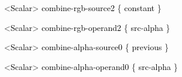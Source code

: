 \documentclass[a4paper]{article}
\newcommand\textstyleOOoComputerKeyWord[1]{\textrm{\textcolor[rgb]{0.0,0.0,0.5019608}{#1}}}
\newcommand\textstyleOOoAssemblerSpecialChar[1]{\textrm{\textcolor[rgb]{0.0,0.5019608,0.0}{#1}}}
\newcommand\textstyleOOoAssemblerIdent[1]{\textrm{\textcolor{black}{#1}}}
\begin{document}
{\color{black}
\textstyleOOoComputerKeyWord{\textcolor{black}{\ \ \ \ \ \ }}\textstyleOOoAssemblerSpecialChar{{\textless}}\textstyleOOoAssemblerIdent{Scalar}\textstyleOOoAssemblerSpecialChar{{\textgreater}}\textstyleOOoComputerKeyWord{\textcolor{black}{
}}\textstyleOOoAssemblerIdent{combine}\textstyleOOoAssemblerSpecialChar{{}-}\textstyleOOoAssemblerIdent{rgb}\textstyleOOoAssemblerSpecialChar{{}-}\textstyleOOoAssemblerIdent{source2}\textstyleOOoComputerKeyWord{\textcolor{black}{
}}\textstyleOOoAssemblerSpecialChar{\{}\textstyleOOoComputerKeyWord{\textcolor{black}{
}}\textstyleOOoAssemblerIdent{constant}\textstyleOOoComputerKeyWord{\textcolor{black}{
}}\textstyleOOoAssemblerSpecialChar{\}}}

{\color{black}
\textstyleOOoComputerKeyWord{\textcolor{black}{\ \ \ \ \ \ }}\textstyleOOoAssemblerSpecialChar{{\textless}}\textstyleOOoAssemblerIdent{Scalar}\textstyleOOoAssemblerSpecialChar{{\textgreater}}\textstyleOOoComputerKeyWord{\textcolor{black}{
}}\textstyleOOoAssemblerIdent{combine}\textstyleOOoAssemblerSpecialChar{{}-}\textstyleOOoAssemblerIdent{rgb}\textstyleOOoAssemblerSpecialChar{{}-}\textstyleOOoAssemblerIdent{operand2}\textstyleOOoComputerKeyWord{\textcolor{black}{
}}\textstyleOOoAssemblerSpecialChar{\{}\textstyleOOoComputerKeyWord{\textcolor{black}{
}}\textstyleOOoAssemblerIdent{src}\textstyleOOoAssemblerSpecialChar{{}-}\textstyleOOoAssemblerIdent{alpha}\textstyleOOoComputerKeyWord{\textcolor{black}{
}}\textstyleOOoAssemblerSpecialChar{\}}}

{\color{black}
\textstyleOOoComputerKeyWord{\textcolor{black}{\ \ \ \ \ \ }}\textstyleOOoAssemblerSpecialChar{{\textless}}\textstyleOOoAssemblerIdent{Scalar}\textstyleOOoAssemblerSpecialChar{{\textgreater}}\textstyleOOoComputerKeyWord{\textcolor{black}{
}}\textstyleOOoAssemblerIdent{combine}\textstyleOOoAssemblerSpecialChar{{}-}\textstyleOOoAssemblerIdent{alpha}\textstyleOOoAssemblerSpecialChar{{}-}\textstyleOOoAssemblerIdent{source0}\textstyleOOoComputerKeyWord{\textcolor{black}{
}}\textstyleOOoAssemblerSpecialChar{\{}\textstyleOOoComputerKeyWord{\textcolor{black}{
}}\textstyleOOoAssemblerIdent{previous}\textstyleOOoComputerKeyWord{\textcolor{black}{
}}\textstyleOOoAssemblerSpecialChar{\}}}

{\color{black}
\textstyleOOoComputerKeyWord{\textcolor{black}{\ \ \ \ \ \ }}\textstyleOOoAssemblerSpecialChar{{\textless}}\textstyleOOoAssemblerIdent{Scalar}\textstyleOOoAssemblerSpecialChar{{\textgreater}}\textstyleOOoComputerKeyWord{\textcolor{black}{
}}\textstyleOOoAssemblerIdent{combine}\textstyleOOoAssemblerSpecialChar{{}-}\textstyleOOoAssemblerIdent{alpha}\textstyleOOoAssemblerSpecialChar{{}-}\textstyleOOoAssemblerIdent{operand0}\textstyleOOoComputerKeyWord{\textcolor{black}{
}}\textstyleOOoAssemblerSpecialChar{\{}\textstyleOOoComputerKeyWord{\textcolor{black}{
}}\textstyleOOoAssemblerIdent{src}\textstyleOOoAssemblerSpecialChar{{}-}\textstyleOOoAssemblerIdent{alpha}\textstyleOOoComputerKeyWord{\textcolor{black}{
}}\textstyleOOoAssemblerSpecialChar{\}}}
\end{document}
